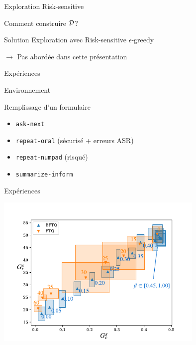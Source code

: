 \documentclass[french]{beamer}
\begin{document}
    \begin{frame}{Exploration Risk-sensitive}

        Comment construire $\mathcal{D}$?

        \begin{exampleblock}{Solution}
            Exploration avec Risk-sensitive $\epsilon$-greedy
        \end{exampleblock}
        $\rightarrow$ Pas abordée dans cette présentation
    \end{frame}

    \begin{frame}{Expériences}

        \begin{block}{Environnement}

            Remplissage d'un formulaire

            \begin{itemize}
                \item \texttt{ask-next}%
                \item \texttt{repeat-oral} (sécurisé + erreurs ASR)%
                \item \texttt{repeat-numpad} (risqué)%
                \item \texttt{summarize-inform}
            \end{itemize}


        \end{block}
    \end{frame}

    \begin{frame}{Expériences}
        \begin{center}
            \includegraphics[width=0.75\textwidth]{img/slot-filling.pdf}
        \end{center}
    \end{frame}
\end{document}
